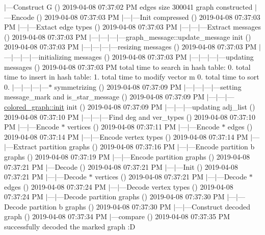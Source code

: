 $\vert$---Construct G () 2019-\/04-\/08 07\+:37\+:02 PM edges size 300041 graph constructed $\vert$---Encode () 2019-\/04-\/08 07\+:37\+:03 PM $\vert$---$\vert$---Init compressed () 2019-\/04-\/08 07\+:37\+:03 PM $\vert$---$\vert$---Extact edge types () 2019-\/04-\/08 07\+:37\+:03 PM $\vert$---$\vert$---$\vert$---Extract messages () 2019-\/04-\/08 07\+:37\+:03 PM $\vert$---$\vert$---$\vert$---$\vert$---graph\+\_\+message\+::update\+\_\+message init () 2019-\/04-\/08 07\+:37\+:03 PM $\vert$---$\vert$---$\vert$---$\vert$---resizing messages () 2019-\/04-\/08 07\+:37\+:03 PM $\vert$---$\vert$---$\vert$---$\vert$---initializing messages () 2019-\/04-\/08 07\+:37\+:03 PM $\vert$---$\vert$---$\vert$---$\vert$---updating messages () 2019-\/04-\/08 07\+:37\+:03 PM total time to search in hash table\+: 0. total time to insert in hash table\+: 1. total time to modify vector m 0. total time to sort 0. $\vert$---$\vert$---$\vert$---$\vert$---$\ast$ symmetrizing () 2019-\/04-\/08 07\+:37\+:09 PM $\vert$---$\vert$---$\vert$---$\vert$---setting message\+\_\+mark and is\+\_\+star\+\_\+message () 2019-\/04-\/08 07\+:37\+:09 PM $\vert$---$\vert$---$\vert$---\hyperlink{classcolored__graph_a0e867afa9f5491dfc05bed10680f0709}{colored\+\_\+graph\+::init} init () 2019-\/04-\/08 07\+:37\+:09 PM $\vert$---$\vert$---$\vert$---updating adj\+\_\+list () 2019-\/04-\/08 07\+:37\+:10 PM $\vert$---$\vert$---$\vert$---Find deg and ver\+\_\+types () 2019-\/04-\/08 07\+:37\+:10 PM $\vert$---$\vert$---Encode $\ast$ vertices () 2019-\/04-\/08 07\+:37\+:11 PM $\vert$---$\vert$---Encode $\ast$ edges () 2019-\/04-\/08 07\+:37\+:14 PM $\vert$---$\vert$---Encode vertex types () 2019-\/04-\/08 07\+:37\+:14 PM $\vert$---$\vert$---Extract partition graphs () 2019-\/04-\/08 07\+:37\+:16 PM $\vert$---$\vert$---Encode partition b graphs () 2019-\/04-\/08 07\+:37\+:19 PM $\vert$---$\vert$---Encode partition graphs () 2019-\/04-\/08 07\+:37\+:21 PM $\vert$---Decode () 2019-\/04-\/08 07\+:37\+:21 PM $\vert$---$\vert$---Init () 2019-\/04-\/08 07\+:37\+:21 PM $\vert$---$\vert$---Decode $\ast$ vertices () 2019-\/04-\/08 07\+:37\+:21 PM $\vert$---$\vert$---Decode $\ast$ edges () 2019-\/04-\/08 07\+:37\+:24 PM $\vert$---$\vert$---Decode vertex types () 2019-\/04-\/08 07\+:37\+:24 PM $\vert$---$\vert$---Decode partition graphs () 2019-\/04-\/08 07\+:37\+:30 PM $\vert$---$\vert$---Decode partition b graphs () 2019-\/04-\/08 07\+:37\+:30 PM $\vert$---$\vert$---Construct decoded graph () 2019-\/04-\/08 07\+:37\+:34 PM $\vert$---compare () 2019-\/04-\/08 07\+:37\+:35 PM successfully decoded the marked graph \+:D

